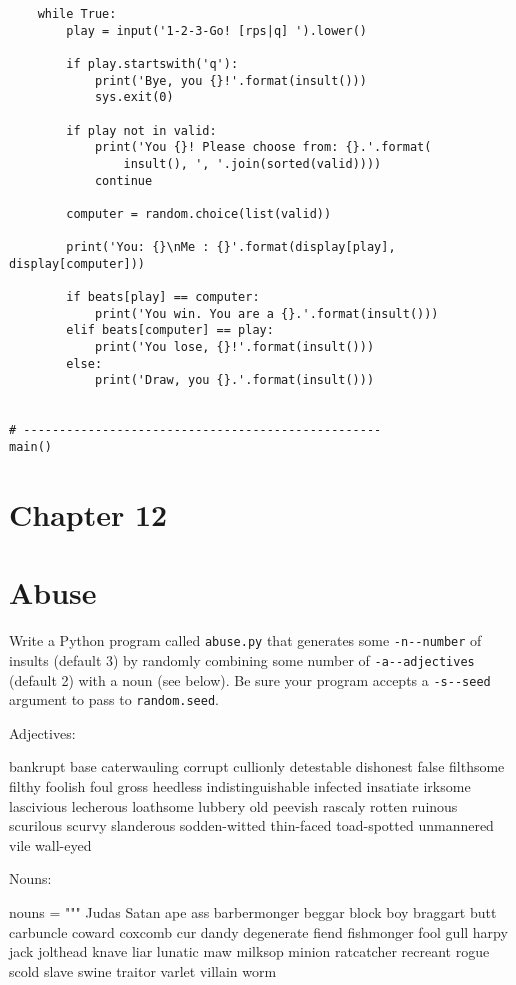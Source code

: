 \documentclass[]{article}
\begin{document}
\begin{verbatim}
    while True:
        play = input('1-2-3-Go! [rps|q] ').lower()

        if play.startswith('q'):
            print('Bye, you {}!'.format(insult()))
            sys.exit(0)

        if play not in valid:
            print('You {}! Please choose from: {}.'.format(
                insult(), ', '.join(sorted(valid))))
            continue

        computer = random.choice(list(valid))

        print('You: {}\nMe : {}'.format(display[play], display[computer]))

        if beats[play] == computer:
            print('You win. You are a {}.'.format(insult()))
        elif beats[computer] == play:
            print('You lose, {}!'.format(insult()))
        else:
            print('Draw, you {}.'.format(insult()))


# --------------------------------------------------
main()
\end{verbatim}

\pagebreak

\hypertarget{chapter-12}{%
\section{Chapter 12}\label{chapter-12}}

\hypertarget{abuse}{%
\section{Abuse}\label{abuse}}

Write a Python program called \texttt{abuse.py} that generates some
\texttt{-n\textbar{}-\/-number} of insults (default 3) by randomly
combining some number of \texttt{-a\textbar{}-\/-adjectives} (default 2)
with a noun (see below). Be sure your program accepts a
\texttt{-s\textbar{}-\/-seed} argument to pass to \texttt{random.seed}.

Adjectives:

bankrupt base caterwauling corrupt cullionly detestable dishonest false
filthsome filthy foolish foul gross heedless indistinguishable infected
insatiate irksome lascivious lecherous loathsome lubbery old peevish
rascaly rotten ruinous scurilous scurvy slanderous sodden-witted
thin-faced toad-spotted unmannered vile wall-eyed

Nouns:

nouns = """ Judas Satan ape ass barbermonger beggar block boy braggart
butt carbuncle coward coxcomb cur dandy degenerate fiend fishmonger fool
gull harpy jack jolthead knave liar lunatic maw milksop minion
ratcatcher recreant rogue scold slave swine traitor varlet villain worm
\end{document}

